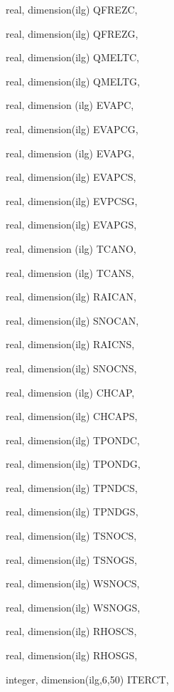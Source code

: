 {\begin{DoxyParamCaption}
\item[{real, dimension(ilg)}]{Q\+F\+R\+E\+Z\+C, }
\item[{real, dimension(ilg)}]{Q\+F\+R\+E\+Z\+G, }
\item[{real, dimension(ilg)}]{Q\+M\+E\+L\+T\+C, }
\item[{real, dimension(ilg)}]{Q\+M\+E\+L\+T\+G, }
\item[{real, dimension (ilg)}]{E\+V\+A\+P\+C, }
\item[{real, dimension(ilg)}]{E\+V\+A\+P\+C\+G, }
\item[{real, dimension (ilg)}]{E\+V\+A\+P\+G, }
\item[{real, dimension(ilg)}]{E\+V\+A\+P\+C\+S, }
\item[{real, dimension(ilg)}]{E\+V\+P\+C\+S\+G, }
\item[{real, dimension(ilg)}]{E\+V\+A\+P\+G\+S, }
\item[{real, dimension (ilg)}]{T\+C\+A\+N\+O, }
\item[{real, dimension (ilg)}]{T\+C\+A\+N\+S, }
\item[{real, dimension(ilg)}]{R\+A\+I\+C\+A\+N, }
\item[{real, dimension(ilg)}]{S\+N\+O\+C\+A\+N, }
\item[{real, dimension(ilg)}]{R\+A\+I\+C\+N\+S, }
\item[{real, dimension(ilg)}]{S\+N\+O\+C\+N\+S, }
\item[{real, dimension (ilg)}]{C\+H\+C\+A\+P, }
\item[{real, dimension(ilg)}]{C\+H\+C\+A\+P\+S, }
\item[{real, dimension(ilg)}]{T\+P\+O\+N\+D\+C, }
\item[{real, dimension(ilg)}]{T\+P\+O\+N\+D\+G, }
\item[{real, dimension(ilg)}]{T\+P\+N\+D\+C\+S, }
\item[{real, dimension(ilg)}]{T\+P\+N\+D\+G\+S, }
\item[{real, dimension(ilg)}]{T\+S\+N\+O\+C\+S, }
\item[{real, dimension(ilg)}]{T\+S\+N\+O\+G\+S, }
\item[{real, dimension(ilg)}]{W\+S\+N\+O\+C\+S, }
\item[{real, dimension(ilg)}]{W\+S\+N\+O\+G\+S, }
\item[{real, dimension(ilg)}]{R\+H\+O\+S\+C\+S, }
\item[{real, dimension(ilg)}]{R\+H\+O\+S\+G\+S, }
\item[{integer, dimension(ilg,6,50)}]{I\+T\+E\+R\+C\+T, }

\end{DoxyParamCaption}}
